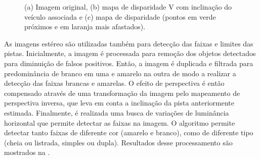 \begin{figure}[h]
\centering
{}\quad
{}\quad
{}
\caption{(a) Imagem original, (b) mapa de disparidade V com inclinação do veículo associada e (c) mapa de disparidade (pontos em verde próximos e em laranja mais afastados).}%
\label{fig:trinocular_obstacle}%
\end{figure}

As imagens estéreo são utilizadas também para detecção das faixas e limites das pistas. Inicialmente, a imagem é processada para remoção dos objetos detectados para diminuição de falsos positivos. Então, a imagem é duplicada e filtrada para predominância de branco em uma e amarelo na outra de modo a realizar a detecção das faixas brancas e amarelas. O efeito de perspectiva é então compensado através de uma transformação da imagem pelo mapeamento de perspectiva inversa, que leva em conta a inclinação da pista anteriormente estimada. Finalmente, é realizada uma busca de variações de luminância horizontal que permite detectar as faixas na imagem. O algoritmo permite detectar tanto faixas de diferente cor (amarelo e branco), como de diferente tipo (cheia ou listrada, simples ou dupla). Resultados desse processamento são mostrados na .

